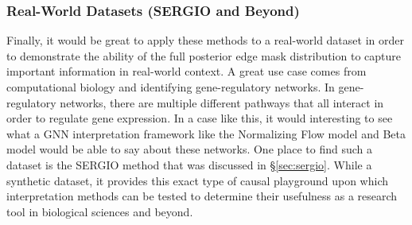 \subsubsection{Real-World Datasets (SERGIO and Beyond)}
Finally, it would be great to apply these methods to a real-world dataset in order to demonstrate the ability of the full posterior edge mask distribution to capture important information in real-world context. A great use case comes from computational biology and identifying gene-regulatory networks. In gene-regulatory networks, there are multiple different pathways that all interact in order to regulate gene expression. In a case like this, it would interesting to see what a GNN interpretation framework like the Normalizing Flow model and Beta model would be able to say about these networks. One place to find such a dataset is the SERGIO \cite{dibaeinia_sergio_2020} method that was discussed in \S\ref{sec:sergio}. While a synthetic dataset, it provides this exact type of causal playground upon which interpretation methods can be tested to determine their usefulness as a research tool in biological sciences and beyond.

\newpage
